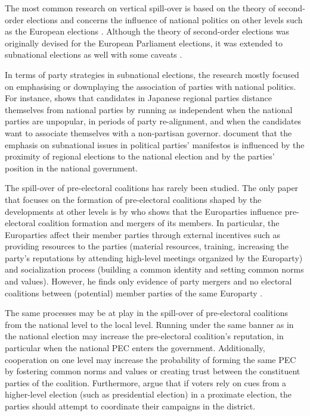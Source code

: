 \documentclass[]{interact}
\theoremstyle{plain}%
\theoremstyle{definition}
\theoremstyle{remark}
\begin{document}
The most common research on vertical spill-over is based on the theory of second-order elections and concerns the influence of national politics on other levels such as the European elections \citep{reif1980}. Although the theory of second-order elections was originally devised for the European Parliament elections, it was extended to subnational elections as well with some caveats \citep[see e.g.][]{heath1999, schakel2013}. 

In terms of party strategies in subnational elections, the research mostly focused on emphasising or downplaying the association of parties with national politics. For instance, \citet{hijino2021} shows that candidates in Japanese regional parties distance themselves from national parties by running as independent when the national parties are unpopular, in periods of party re-alignment, and when the candidates want to associate themselves with a non-partisan governor. \citet{gross2022} document that the emphasis on subnational issues in political parties' manifestos is influenced by the proximity of regional elections to the national election and by the parties' position in the national government.

The spill-over of pre-electoral coalitions has rarely been studied. The only paper that focuses on the formation of pre-electoral coalitions shaped by the developments at other levels is by \citet{ibenskas2020} who shows that the Europarties influence pre-electoral coalition formation and mergers of its members. In particular, the Europarties affect their member parties through external incentives such as providing resources to the parties (material resources, training, increasing the party's reputations by attending high-level meetings organized by the Europarty) and socialization process (building a common identity and setting common norms and values). However, he finds only evidence of party mergers and no electoral coalitions between (potential) member parties of the same Europarty \citep{ibenskas2020}.

The same processes may be at play in the spill-over of pre-electoral coalitions from the national level to the local level. Running under the same banner as in the national election may increase the pre-electoral coalition's reputation, in particular when the national PEC enters the government. Additionally, cooperation on one level may increase the probability of forming the same PEC by fostering common norms and values or creating trust between the constituent parties of the coalition. Furthermore, \citet{hicken2011} argue that if voters rely on cues from a higher-level election (such as presidential election) in a proximate election, the parties should attempt to coordinate their campaigns in the district.
\end{document}
